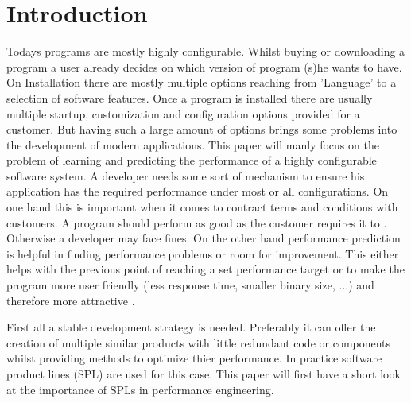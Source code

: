 \section{Introduction} \label{sec:introduction}
Todays programs are mostly highly configurable. Whilst buying or downloading a program a user already decides on which version of program (s)he wants to have. On Installation there are mostly multiple options reaching from 'Language' to a selection of software features. Once a program is installed there are usually multiple startup, customization and configuration options provided for a customer. But having such a large amount of options brings some problems into the development of modern applications. This paper will manly focus on the problem of learning and predicting the performance of a highly configurable software system.
A developer needs some sort of mechanism to ensure his application has the required performance under most or all configurations. On one hand this is important when it comes to contract terms and conditions with customers. A program should perform as good as the customer requires it to \cite{VariabilityAwarePerformancePredictionJianmeiSigmundApel}. Otherwise a developer may face fines. On the other hand performance prediction is helpful in finding performance problems or room for improvement. This either helps with the previous point of reaching a set performance target or to make the program more user friendly (less response time, smaller binary size, ...) and therefore more attractive \cite{SoftwareEngineeringMenschenProzesseTechniken}.

First all a stable development strategy is needed. Preferably it can offer the creation of multiple similar products with little redundant code or components whilst providing methods to optimize thier performance. In practice software product lines (SPL) are used for this case. This paper will first have a short look at the importance of SPLs in performance engineering.

